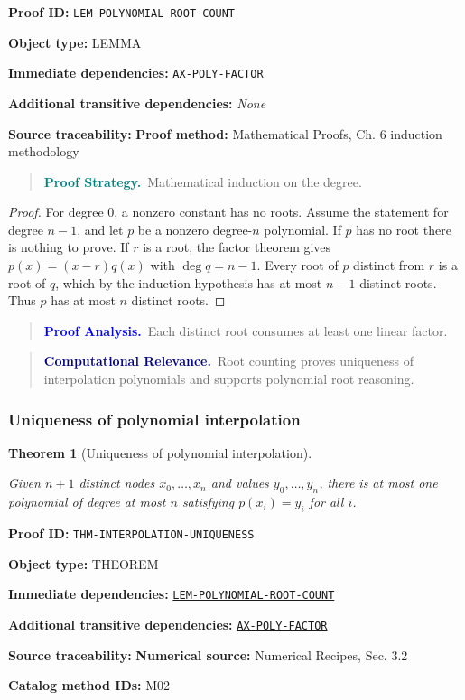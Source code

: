 \documentclass[10pt]{article}
\newcommand{\pidraw}[1]{\begingroup\urlstyle{tt}\nolinkurl{#1}\endgroup}
\newcommand{\pidref}[1]{\hyperref[prf:#1]{\pidraw{#1}}}
\newtheorem{theorem}{Theorem}[section]
\theoremstyle{definition}
\theoremstyle{remark}
\newenvironment{proofstrategy}
{\begin{quote}\small\noindent\textbf{\textcolor{teal}{Proof Strategy.}}\ }
{\end{quote}}
\newenvironment{proofanalysis}
{\begin{quote}\small\noindent\textbf{\textcolor{blue}{Proof Analysis.}}\ }
{\end{quote}}
\newenvironment{computationalrelevance}
{\begin{quote}\small\noindent\textbf{\textcolor{navy}{Computational Relevance.}}\ }
{\end{quote}}
\newcommand{\meta}[2]{\noindent\textbf{#1:} #2\par}
\begin{document}
\meta{Proof ID}{\pidraw{LEM-POLYNOMIAL-ROOT-COUNT}}
\meta{Object type}{LEMMA}
\meta{Immediate dependencies}{\pidref{AX-POLY-FACTOR}}
\meta{Additional transitive dependencies}{\emph{None}}
\meta{Source traceability}{\textbf{Proof method:} Mathematical Proofs, Ch. 6 induction methodology}

\begin{proofstrategy}Mathematical induction on the degree.\end{proofstrategy}

\begin{proof}

For degree $0$, a nonzero constant has no roots. Assume the statement for degree
$n-1$, and let $p$ be a nonzero degree-$n$ polynomial. If $p$ has no root there is
nothing to prove. If $r$ is a root, the factor theorem gives
$p(x)=(x-r)q(x)$ with $\deg q=n-1$. Every root of $p$ distinct from $r$ is a
root of $q$, which by the induction hypothesis has at most $n-1$ distinct roots.
Thus $p$ has at most $n$ distinct roots.

\end{proof}

\begin{proofanalysis}Each distinct root consumes at least one linear factor.\end{proofanalysis}

\begin{computationalrelevance}Root counting proves uniqueness of interpolation polynomials and supports polynomial root reasoning.\end{computationalrelevance}

\subsubsection{Uniqueness of polynomial interpolation}

\begin{theorem}[Uniqueness of polynomial interpolation]\label{prf:THM-INTERPOLATION-UNIQUENESS}

Given $n+1$ distinct nodes $x_0,\ldots,x_n$ and values $y_0,\ldots,y_n$, there is at most one polynomial of degree at most $n$ satisfying $p(x_i)=y_i$ for all $i$.

\end{theorem}

\meta{Proof ID}{\pidraw{THM-INTERPOLATION-UNIQUENESS}}
\meta{Object type}{THEOREM}
\meta{Immediate dependencies}{\pidref{LEM-POLYNOMIAL-ROOT-COUNT}}
\meta{Additional transitive dependencies}{\pidref{AX-POLY-FACTOR}}
\meta{Source traceability}{\textbf{Numerical source:} Numerical Recipes, Sec. 3.2}
\meta{Catalog method IDs}{M02}
\end{document}
